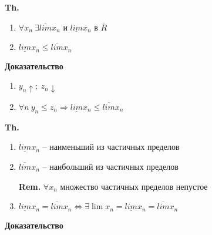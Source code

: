\documentclass[14pt, letter paper]{article}
\begin{document}
\textbf{Th.}

\begin{enumerate}
    \item $\forall x_n\ \exists \overline{lim} x_n$ и $\underline{lim} x_n$ в $\overline{R}$
    \item $\underline{lim} x_n \leq \overline{lim} x_n$
\end{enumerate}

\begin{center}
    \textbf{Доказательство}
\end{center}

\begin{enumerate}
    \item $y_n \uparrow;\ z_n \downarrow$
    \item $\forall n\ y_n \leq z_n \Rightarrow \underline{lim} x_n \leq \overline{lim} x_n$
\end{enumerate}

\textbf{Th.}

\begin{enumerate}
    \item $\underline{lim} x_n$ -- наименьший из частичных пределов

    \item $\overline{lim} x_n$ -- наибольший из частичных пределов

    \textbf{Rem.} $\forall x_n$ множество частичных пределов непустое

    \item $\underline{lim} x_n = \overline{lim} x_n \Leftrightarrow \exists \lim{x_n} = \underline{lim} x_n = \overline{lim} x_n$
\end{enumerate}

\begin{center}
    \textbf{Доказательство}
\end{center}
\end{document}
